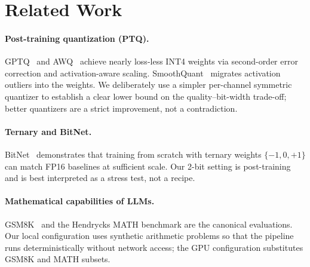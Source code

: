 \section{Related Work}

\paragraph{Post-training quantization (PTQ).}
GPTQ~\cite{frantar2022gptq} and AWQ~\cite{lin2023awq} achieve nearly
loss-less INT4 weights via second-order error correction and
activation-aware scaling. SmoothQuant~\cite{xiao2022smoothquant} migrates
activation outliers into the weights. We deliberately use a simpler
per-channel symmetric quantizer to establish a clear lower bound on the
quality--bit-width trade-off; better quantizers are a strict improvement,
not a contradiction.

\paragraph{Ternary and BitNet.} BitNet~\cite{wang2023bitnet} demonstrates
that training from scratch with ternary weights $\{-1,0,+1\}$ can match
FP16 baselines at sufficient scale. Our 2-bit setting is post-training and
is best interpreted as a stress test, not a recipe.

\paragraph{Mathematical capabilities of LLMs.}
GSM8K~\cite{cobbe2021gsm8k} and the Hendrycks MATH benchmark
\cite{hendrycks2021math} are the canonical evaluations. Our local
configuration uses synthetic arithmetic problems so that the pipeline runs
deterministically without network access; the GPU configuration substitutes
GSM8K and MATH subsets.
